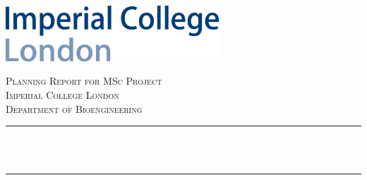 \begin{titlepage}

\newcommand{\HRule}{\rule{\linewidth}{0.5mm}} %

\newcommand{\quickwordcount}[1]{%
  \immediate\write18{texcount -1 -sum -merge -q #1.tex output.bbl > #1-words.sum }%
  
}


\includegraphics[width=8cm]{title/logo.png}\\[2.5cm] %
 

\center %


\textsc{\LARGE Planning Report for MSc Project}\\[1.5cm] %
\textsc{\Large Imperial College London}\\[0.5cm] %
\textsc{\large Department of Bioengineering}\\[1.5cm] %

\makeatletter
\HRule \\[0.4cm]
{ \huge \bfseries \@title}\\[0.4cm] %
\HRule \\[1.5cm]
 


\end{titlepage}
